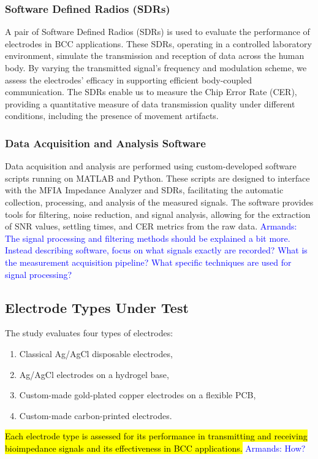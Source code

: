 \documentclass[conference]{IEEEtran}
\newcommand{\notea}[1]{\textcolor{blue}{Armands: #1}}
\begin{document}
\subsubsection{Software Defined Radios (SDRs)}
A pair of Software Defined Radios (SDRs) is used to evaluate the performance of electrodes in BCC applications. These SDRs, operating in a controlled laboratory environment, simulate the transmission and reception of data across the human body. By varying the transmitted signal's frequency and modulation scheme, we assess the electrodes' efficacy in supporting efficient body-coupled communication. The SDRs enable us to measure the Chip Error Rate (CER), providing a quantitative measure of data transmission quality under different conditions, including the presence of movement artifacts.

\subsubsection{Data Acquisition and Analysis Software}
Data acquisition and analysis are performed using custom-developed software scripts running on MATLAB and Python. These scripts are designed to interface with the MFIA Impedance Analyzer and SDRs, facilitating the automatic collection, processing, and analysis of the measured signals. The software provides tools for filtering, noise reduction, and signal analysis, allowing for the extraction of SNR values, settling times, and CER metrics from the raw data. \notea{The signal processing and filtering methods should be explained a bit more. Instead describing software, focus on what signals exactly are recorded? What is the measurement acquisition pipeline? What specific techniques are used for signal processing? }

\subsection{Electrode Types Under Test}

The study evaluates four types of electrodes:
\begin{enumerate}
    \item Classical Ag/AgCl disposable electrodes,
    \item Ag/AgCl electrodes on a hydrogel base,
    \item Custom-made gold-plated copper electrodes on a flexible PCB,
    \item Custom-made carbon-printed electrodes.
\end{enumerate}
\hl{Each electrode type is assessed for its performance in transmitting and receiving bioimpedance signals and its effectiveness in BCC applications.} \notea{How?}
\end{document}
